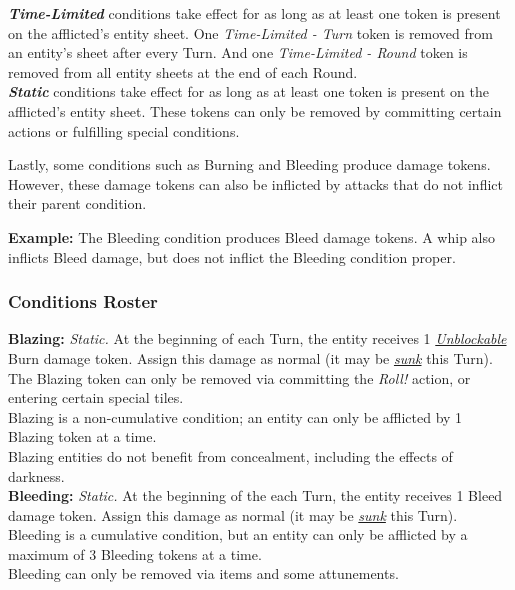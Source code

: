 \documentclass[12pt]{article}
\newcommand{\reftoit}[1]{\hyperlink{#1}{\emph{#1}}}
\begin{document}
\begin{multicols*}{2}
\emph{\textbf{Time-Limited}} conditions take effect for as long as at least one token is present on the afflicted’s entity sheet. One \emph{Time-Limited - Turn} token is removed from an entity’s sheet after every Turn. And one \emph{Time-Limited - Round} token is removed from all entity sheets at the end of each Round.\\

\emph{\textbf{Static}}\hypertarget{Static}{} conditions take effect for as long as at least one token is present on the afflicted’s entity sheet. These tokens can only be removed by committing certain actions or fulfilling special conditions.

Lastly, some conditions such as Burning and Bleeding produce damage tokens. However, these damage tokens can also be inflicted by attacks that do not inflict their parent condition.

\begin{tcolorbox}
\textbf{Example:} The Bleeding condition produces Bleed damage tokens. A whip also inflicts Bleed damage, but does not inflict the Bleeding condition proper.
\end{tcolorbox}

\subsubsection{Conditions Roster}
\textbf{Blazing:} \emph{Static.} At the beginning of each Turn, the entity receives 1 \reftoit{Unblockable} Burn damage token. Assign this damage as normal (it may be \reftoit{sunk} this Turn).\\
The Blazing token can only be removed via committing the \emph{Roll!} action, or entering certain special tiles.\\
Blazing is a non-cumulative condition; an entity can only be afflicted by 1 Blazing token at a time.\\
Blazing entities do not benefit from concealment, including the effects of darkness.\\

\textbf{Bleeding:} \emph{Static.} At the beginning of the each Turn, the entity receives 1 Bleed damage token. Assign this damage as normal (it may be \reftoit{sunk} this Turn).\\
Bleeding is a cumulative condition, but an entity can only be afflicted by a maximum of 3 Bleeding tokens at a time.\\
Bleeding can only be removed via items and some attunements.\\


\end{multicols*}
\end{document}
